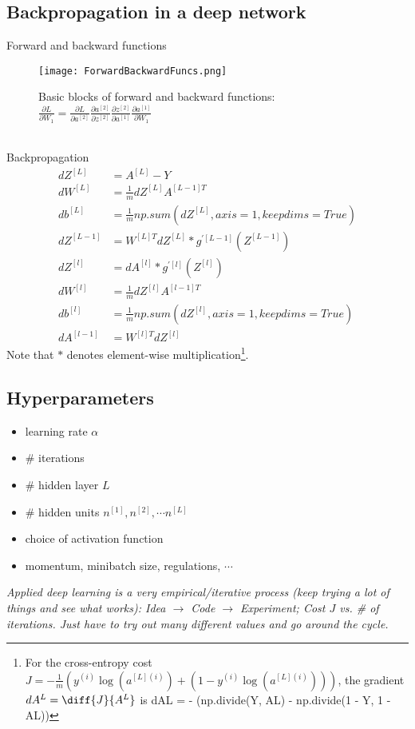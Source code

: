 %
\subsection{Backpropagation in a deep network}
Forward and backward functions
\begin{figure}[h]
    \centering
    \texttt{[image: ForwardBackwardFuncs.png]}
    \caption{Basic blocks of forward and backward functions: $\frac{\partial L}{\partial {W_1}} = \frac{\partial L}{\partial  {a^{[2]}}} \frac{\partial{a^{[2]}}}{\partial  {z^{[2]}}} \frac{\partial{z^{[2]}}}{\partial  {a^{[1]}}} \frac{\partial{a^{[1]}}}{\partial {W_1}}$}
    \label{fig:ForwardBackwardFuncs}
    \end{figure}
\\
Backpropagation
\begin{align}
dZ^{[L]} &= A^{[L]} - Y\\
dW^{[L]} &=  \frac{1}{m}dZ^{[L]}A^{[L-1]T}\\
db^{[L]} &= \frac{1}{m}np.sum(dZ^{[L]}, axis = 1, keepdims = True)\\
dZ^{[L-1]} &= W^{[L]T}dZ^{[L]} * g^{'[L-1]}(Z^{[L-1]})\\
dZ^{[l]} &= dA^{[l]} * g^{'[l]}(Z^{[l]})\\
dW^{[l]} &= \frac{1}{m}dZ^{[l]}A^{[l-1]T}\\
db^{[l]} &= \frac{1}{m}np.sum(dZ^{[l]}, axis = 1, keepdims = True)\\
dA^{[l-1]} &= W^{[l]T}dZ^{[l]}
\end{align}
Note that $*$ denotes element-wise multiplication\footnote{For the cross-entropy cost $J = -\frac{1}{m}(y^{(i)}\log{(a^{[L](i)})} + (1-y^{(i)}\log{(a^{[L](i)})}))$, the gradient $dA^{L} = \diff{J}{A^{{L}}}$ is dAL = - (np.divide(Y, AL) - np.divide(1 - Y, 1 - AL))}.

%
\subsection{Hyperparameters}
\begin{itemize}
\item
learning rate $\alpha$
\item
\# iterations
\item
\# hidden layer $L$
\item
\# hidden units $n^{[1]}, n^{[2]}, \cdots n^{[L]}$
\item
choice of activation function
\item
momentum, minibatch size, regulations, $\cdots$
\end{itemize}
\emph{\textcolor{Bittersweet}{Applied deep learning is a very empirical/iterative process (keep trying a lot of things and see what works): Idea $\rightarrow$ Code $\rightarrow$ Experiment; Cost $J$ vs. \# of iterations. Just have to try out many different values and go around the cycle.}}


